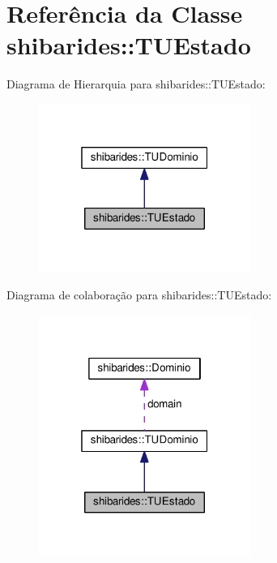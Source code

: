 \hypertarget{classshibarides_1_1TUEstado}{}\section{Referência da Classe shibarides\+:\+:T\+U\+Estado}
\label{classshibarides_1_1TUEstado}


Diagrama de Hierarquia para shibarides\+:\+:T\+U\+Estado\+:\nopagebreak
\begin{figure}[H]
\begin{center}
\leavevmode
\includegraphics[width=196pt]{classshibarides_1_1TUEstado__inherit__graph}
\end{center}
\end{figure}


Diagrama de colaboração para shibarides\+:\+:T\+U\+Estado\+:\nopagebreak
\begin{figure}[H]
\begin{center}
\leavevmode
\includegraphics[width=196pt]{classshibarides_1_1TUEstado__coll__graph}
\end{center}
\end{figure}
